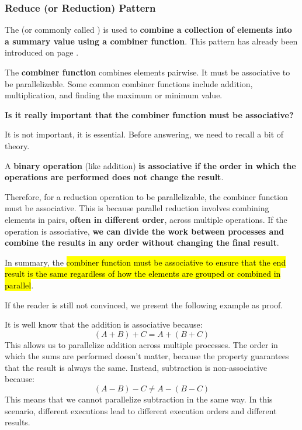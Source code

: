 \subsubsection{Reduce (or Reduction) Pattern}\label{subsubsection: Reduce (or Reduction) Pattern}

The  (or commonly called ) is used to \textbf{combine a collection of elements into a summary value using a combiner function}. This pattern has already been introduced on page .

\highspace
The \textbf{combiner function} combines elements pairwise. It must be associative to be parallelizable. Some common combiner functions include addition, multiplication, and finding the maximum or minimum value.

\highspace
\begin{flushleft}
    \textcolor{Green3}{ \textbf{Is it really important that the combiner function must be associative?}}
\end{flushleft}
It is not important, it is essential. Before answering, we need to recall a bit of theory.

\highspace
A \textbf{binary operation} (like addition) \textbf{is associative if the order in which the operations are performed does not change the result}.

\highspace
Therefore, for a reduction operation to be parallelizable, the combiner function must be associative. This is because parallel reduction involves combining elements in pairs, \textbf{often in different order}, across multiple operations. If the operation is associative, \textbf{we can divide the work between processes and combine the results in any order without changing the final result}.

\highspace
In summary, the \hl{combiner function must be associative to ensure that the end result is the same regardless of how the elements are grouped or combined in parallel}.

\highspace
If the reader is still not convinced, we present the following example as proof.

\highspace
\begin{examplebox}
    It is well know that the addition is associative because:
    \begin{equation*}
        \left(A + B\right) + C = A + \left(B + C\right)
    \end{equation*}
    This allows us to parallelize addition across multiple processes. The order in which the sums are performed doesn't matter, because the property guarantees that the result is always the same. Instead, subtraction is non-associative because:
    \begin{equation*}
        \left(A - B\right) - C \ne A - \left(B - C\right)
    \end{equation*}
    This means that we cannot parallelize subtraction in the same way. In this scenario, different executions lead to different execution orders and different results.
\end{examplebox}

